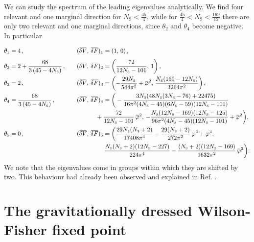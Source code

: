 \documentclass[11pt]{book} %
\newcommand{\overbar}[1]{\mkern 1.5mu\overline{\mkern-1.5mu#1\mkern-1.5mu}\mkern 1.5mu}
\newcommand\NS{ N_{\scriptscriptstyle{\mathrm{S}}} }
\newcommand{\deltaV}{\overbar {\delta V}}
\newcommand{\deltaF}{\overbar {\delta F}}
\newcommand{\bp}{\overbar \varphi}
\numberwithin{equation}{chapter}
\begin{document}
We can study the spectrum of the leading eigenvalues analytically.
We find four relevant and one marginal direction for $\NS<\frac{45}{4}$,
while for $\frac{45}{4}<\NS<\frac{169}{12}$ there are only two relevant and one marginal directions,
since $\theta_2$ and $\theta_4$ become negative. In particular
\begin{alignat}{2}
  \theta_1 &= 4 \,,                                      && (\deltaV, \, \deltaF)_1 = \vphantom{\frac 11} (1, \, 0) \,, \nonumber \\
  \theta_2 &= 2 + \frac{68}{3 \, (45 - 4\NS)} \,, \quad  && (\deltaV, \, \deltaF)_2 = \left( \frac{72}{12 \NS - 101}, \, 1 \right)  , \nonumber\\
  \theta_3 &= 2 \,,                                      && (\deltaV, \, \deltaF)_3 = \left( -\frac{29 \NS}{544\pi^2} + \bp^2, \, \frac{\NS(169 - 12 \NS)}{3264\pi^2}\right) , \nonumber\\
  \theta_4 &=     \frac{68}{3 \, (45 - 4\NS)} \,,        && (\deltaV, \, \deltaF)_4 = \bigg( -\frac{3\NS(48\NS(3 \NS - 76)+22475)}{16\pi^2(4\NS - 45)(6\NS - 59) (12\NS - 101)} \nonumber \\
                                                       & && \hspace{1.1cm} + \frac{72}{12\NS - 101} \, \bp^2, \,  - \frac{\NS(12\NS - 169)(12\NS-125)} {96\pi^2(4\NS - 45)(12 \NS - 101)}+\bp^2\bigg) , \nonumber \\
  \theta_5 &= 0 \,,                                      && (\deltaV, \, \deltaF)_5 = \bigg( \frac{29 \NS (\NS+2)}{17408\pi^4} - \frac{29(\NS+2)}{272\pi ^2} \, \bp^2 + \bp^4, \nonumber \\
                                                       & && \hspace{1.6cm} \frac{\NS (\NS+2) (12 \NS - 227)}{224\pi ^4}-\frac{(\NS+2) (12 \NS - 169) }{1632\pi^2} \, \bp^2 \bigg) .
\end{alignat}
We note that the eigenvalues come in groups
within which they are shifted by two.
This behaviour had already been observed and
explained in Ref. \cite{Narain:2009fy}.


\section{The gravitationally dressed Wilson-Fisher fixed point}
\end{document}
